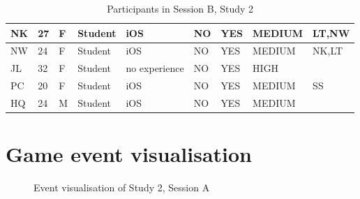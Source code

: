 \begin{table}[H]
{\begin{tabular}{|l|l|l|l|l|l|l|l|l|}
NK       & 27  & F      & Student    & iOS                                                             & NO                                                                 & YES                                                                  & MEDIUM                                                       & LT,NW                                                              \\ \hline
NW       & 24  & F      & Student    & iOS                                                             & NO                                                                 & YES                                                                  & MEDIUM                                                       & NK,LT                                                              \\ \hline
JL       & 32  & F      & Student    & no experience                                                   & NO                                                                 & YES                                                                  & HIGH                                                         &                                                                    \\ \hline
PC       & 20  & F      & Student    & iOS                                                             & NO                                                                 & YES                                                                  & MEDIUM                                                       & SS                                                                 \\ \hline
HQ       & 24  & M      & Student    & iOS                                                             & NO                                                                 & YES                                                                  & MEDIUM                                                       &                                                                    \\ \hline
\end{tabular}}
\caption{Participants in Session B, Study 2}
\end{table}


\section{Game event visualisation}
\begin{figure}[H]
  \centering
  \caption{Event visualisation of Study 2, Session A}
  
\end{figure}

